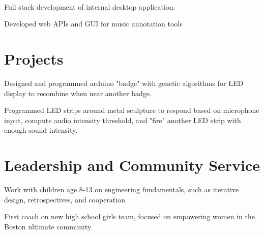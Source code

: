 \documentclass[]{csaund_resume-openfont}
\begin{document}
\begin{minipage}[t]{0.66\textwidth}
 \\
\begin{tightemize}
\item Full stack development of internal desktop application.
\item Developed web APIs and GUI for music annotation tools
\end{tightemize}
\sectionsep



\section{Projects}
\begin{tightemize}
\item Designed and programmed arduino "badge" with  genetic algorithms for LED display to recombine when near another badge.
\end{tightemize}
\sectionsep
{}
\begin{tightemize}
\item Programmed LED strips around metal sculpture to respond based on microphone input, compute audio intensity threshold, and "fire" another LED strip with enough sound intensity.
\end{tightemize}
\sectionsep

\end{minipage}

\pagebreak


\section{Leadership and Community Service}
Work with children age 8-13 on engineering fundamentals, such as iterative design, retrospectives, and cooperation
\sectionsep

First coach on new high school girls team, focused on empowering women in the Boston ultimate community
\sectionsep
\end{document}
